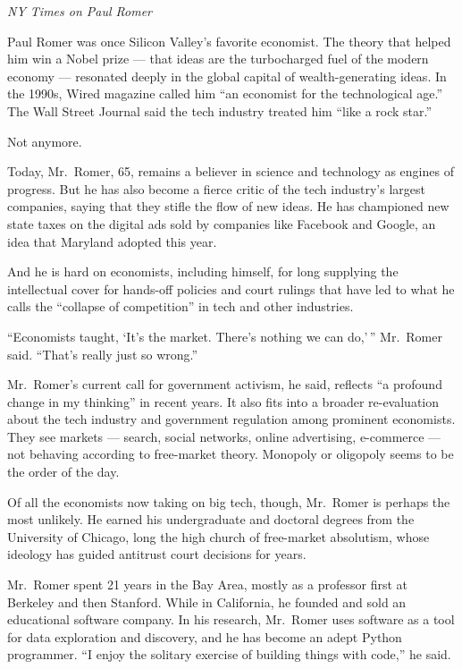 \documentclass[
]{book}
\begin{document}
\emph{NY Times on Paul Romer}

Paul Romer was once Silicon Valley's favorite economist. The theory that helped him win a Nobel prize --- that ideas are the turbocharged fuel of the modern economy --- resonated deeply in the global capital of wealth-generating ideas. In the 1990s, Wired magazine called him ``an economist for the technological age.'' The Wall Street Journal said the tech industry treated him ``like a rock star.''

Not anymore.

Today, Mr.~Romer, 65, remains a believer in science and technology as engines of progress. But he has also become a fierce critic of the tech industry's largest companies, saying that they stifle the flow of new ideas. He has championed new state taxes on the digital ads sold by companies like Facebook and Google, an idea that Maryland adopted this year.

And he is hard on economists, including himself, for long supplying the intellectual cover for hands-off policies and court rulings that have led to what he calls the ``collapse of competition'' in tech and other industries.

``Economists taught, `It's the market. There's nothing we can do,'\,'' Mr.~Romer said. ``That's really just so wrong.''

Mr.~Romer's current call for government activism, he said, reflects ``a profound change in my thinking'' in recent years.
It also fits into a broader re-evaluation about the tech industry and government regulation among prominent economists.
They see markets --- search, social networks, online advertising, e-commerce --- not behaving according to free-market theory. Monopoly or oligopoly seems to be the order of the day.

Of all the economists now taking on big tech, though, Mr.~Romer is perhaps the most unlikely. He earned his undergraduate and doctoral degrees from the University of Chicago, long the high church of free-market absolutism, whose ideology has guided antitrust court decisions for years.

Mr.~Romer spent 21 years in the Bay Area, mostly as a professor first at Berkeley and then Stanford. While in California, he founded and sold an educational software company. In his research, Mr.~Romer uses software as a tool for data exploration and discovery, and he has become an adept Python programmer. ``I enjoy the solitary exercise of building things with code,'' he said.
\end{document}
